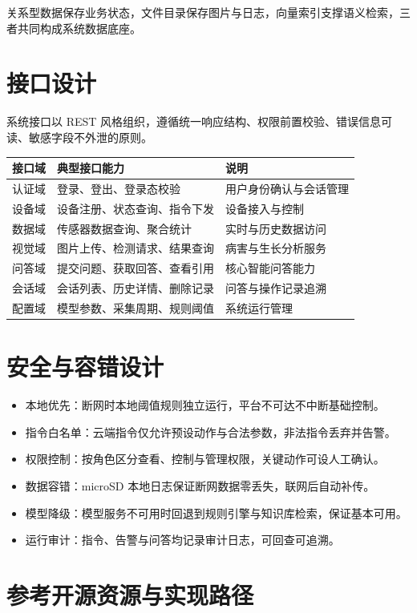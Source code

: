 \documentclass[11pt]{ctexart}
\begin{document}
关系型数据保存业务状态，文件目录保存图片与日志，向量索引支撑语义检索，三者共同构成系统数据底座。

\section{接口设计}
系统接口以 REST 风格组织，遵循统一响应结构、权限前置校验、错误信息可读、敏感字段不外泄的原则。

\begin{longtable}{p{2.6cm}p{5.2cm}p{7.0cm}}
  \toprule
  接口域 & 典型接口能力 & 说明 \\
  \midrule
  认证域 & 登录、登出、登录态校验 & 用户身份确认与会话管理 \\
  设备域 & 设备注册、状态查询、指令下发 & 设备接入与控制 \\
  数据域 & 传感器数据查询、聚合统计 & 实时与历史数据访问 \\
  视觉域 & 图片上传、检测请求、结果查询 & 病害与生长分析服务 \\
  问答域 & 提交问题、获取回答、查看引用 & 核心智能问答能力 \\
  会话域 & 会话列表、历史详情、删除记录 & 问答与操作记录追溯 \\
  配置域 & 模型参数、采集周期、规则阈值 & 系统运行管理 \\
  \bottomrule
\end{longtable}

\section{安全与容错设计}
\begin{itemize}
  \item 本地优先：断网时本地阈值规则独立运行，平台不可达不中断基础控制。
  \item 指令白名单：云端指令仅允许预设动作与合法参数，非法指令丢弃并告警。
  \item 权限控制：按角色区分查看、控制与管理权限，关键动作可设人工确认。
  \item 数据容错：microSD 本地日志保证断网数据零丢失，联网后自动补传。
  \item 模型降级：模型服务不可用时回退到规则引擎与知识库检索，保证基本可用。
  \item 运行审计：指令、告警与问答均记录审计日志，可回查可追溯。
\end{itemize}

\section{参考开源资源与实现路径}
\end{document}

